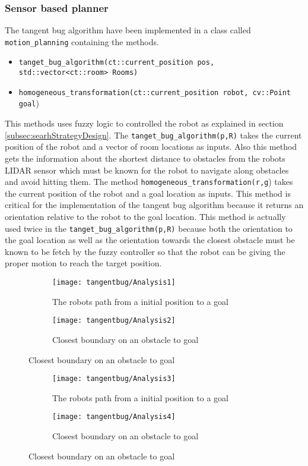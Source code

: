 \documentclass[../Head/Main.tex]{subfiles}
\begin{document}
\subsubsection{Sensor based planner}
\label{subsubsec:tangentBug}
The tangent bug algorithm have been implemented in a class called \texttt{motion\_planning} containing the methods.
\begin{itemize}
	\item \texttt{tanget\_bug\_algorithm(ct::current\_position pos, std::vector<ct::room> Rooms)}
	\item \texttt{homogeneous\_transformation(ct::current\_position robot, cv::Point goal})
\end{itemize}
This methods uses fuzzy logic to controlled the robot as explained in section \ref{subsec:searhStrategyDesign}. The \texttt{tanget\_bug\_algorithm(p,R)} takes the current position of the robot and a vector of room locations as inputs. Also this method gets the information about the shortest distance to obstacles from the robots LIDAR sensor which must be known for the robot to navigate along obstacles and avoid hitting them. The method \texttt{homogeneous\_transformation(r,g}) takes the current position of the robot and a goal location as inputs. This method is critical for the implementation of the tangent bug algorithm because it returns an orientation relative to the robot to the goal location. This method is actually used twice in the \texttt{tanget\_bug\_algorithm(p,R)} because both the orientation to the goal location as well as the orientation towards the closest obstacle must be known to be fetch by the fuzzy controller so that the robot can be giving the proper motion to reach the target position. 

\begin{figure}[H]
  \begin{subfigure}[b]{0.59\textwidth}
    \centering
    \texttt{[image: tangentbug/Analysis1]}
    \caption{The robots path from a initial position to a goal}
    \label{fig:tangentBugRobotPath1}
  \end{subfigure}
  \hfill
   \begin{subfigure}[b]{0.39\textwidth}
    \centering
    \texttt{[image: tangentbug/Analysis2]}
    \caption{Closest boundary on an obstacle to goal}
    \label{fig:closestBoundaryOnObstacle1}
  \end{subfigure}
  \end{figure}
  
\begin{figure}[H]
  \begin{subfigure}[b]{0.59\textwidth}
    \centering
    \texttt{[image: tangentbug/Analysis3]}
    \caption{The robots path from a initial position to a goal}
    \label{fig:tangentBugRobotPath2}
  \end{subfigure}
  \hfill
   \begin{subfigure}[b]{0.39\textwidth}
    \centering
    \texttt{[image: tangentbug/Analysis4]}
    \caption{Closest boundary on an obstacle to goal}
    \label{fig:closestBoundaryOnObstacle2}
  \end{subfigure}
  \end{figure}
  
\end{document}
